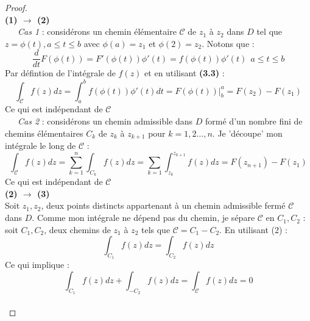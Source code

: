     \newpage
    \begin{proof}\ \\
    \textbf{(1) $\rightarrow$ (2)}\\
    \ \ \ \textit{Cas 1} : considérons un chemin élémentaire $\mathcal{C}$ de $z_1$ à
    $z_2$ dans $D$ tel que $z = \phi(t), a\leq t\leq b$ avec $\phi(a) = z_1$ et $\phi(
    2) = z_2$. Notons que : 
    \begin{equation}
    \frac{d}{dt}F(\phi(t)) = F'(\phi(t))\phi'(t) = f(\phi(t))\phi'(t)\ \ a \leq t\leq b
    \end{equation}
    Par défintion de l'intégrale de $f(z)$ et en utilisant \textbf{(3.3)} :
    \begin{equation}
    \int_\mathcal{C} f(z) dz = \int_a^b f(\phi(t))\phi'(t) dt = F(\phi(t))|_b^a = F(z_2)
    - F(z_1)
    \end{equation}
    Ce qui est indépendant de $\mathcal{C}$\\
    
    \ \ \ \textit{Cas 2} : considérons un chemin admissible dans $D$ formé d'un nombre
    fini de chemins élémentaires $C_k$ de $z_k$ à $z_{k+1}$ pour $k=1,2\dots,n.$ Je
    'découpe' mon intégrale le long de $\mathcal{C}$ :
    \begin{equation}
    \int_\mathcal{C} f(z) dz = \sum_{k=1}^n \int_{C_k} f(z)dz = \sum_{k=1} \int_{z_k}^{z_{k+1}}
    f(z)dz = F(z_{n+1}) - F(z_1)
    \end{equation}
    Ce qui est indépendant de $\mathcal{C}$\\
    
    \textbf{(2) $\rightarrow$ (3)}\\
    Soit $z_1,z_2$, deux points distincts appartenant à un chemin admissible fermé 
    $\mathcal{C}$ dans $D$. Comme mon intégrale ne dépend pas du chemin, je sépare
    $\mathcal{C}$ en $C_1,C_2$ : soit $C_1,C_2$, deux chemins de $z_1$ à $z_2$ tels
    que $\mathcal{C} = C_1-C_2$. En utilisant (2) :
    \begin{equation}
    \int_{C_1} f(z) dz = \int_{C_2} f(z) dz
    \end{equation}
    Ce qui implique : 
    \begin{equation}
    \int_{C_1} f(z) dz + \int_{-C_2} f(z) dz = \int_\mathcal{C}f(z) dz = 0
    \end{equation}\ \\
    

\end{proof}
